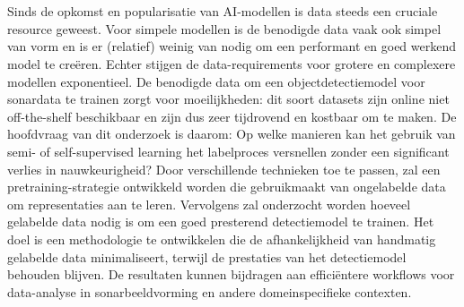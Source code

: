 
%
%
%
%
%


\chapter*{}

Sinds de opkomst en popularisatie van AI-modellen is data steeds een cruciale resource geweest. Voor simpele modellen is de benodigde data vaak ook simpel van vorm en is er (relatief) weinig van nodig om een performant en goed werkend model te creëren. Echter stijgen de data-requirements voor grotere en complexere modellen exponentieel. De benodigde data om een objectdetectiemodel voor sonardata te trainen zorgt voor moeilijkheden: dit soort datasets zijn online niet off-the-shelf beschikbaar en zijn dus zeer tijdrovend en kostbaar om te maken. De hoofdvraag van dit onderzoek is daarom: Op welke manieren kan het gebruik van semi- of self-supervised learning het labelproces versnellen zonder een significant verlies in nauwkeurigheid? Door verschillende technieken toe te passen, zal een pretraining-strategie ontwikkeld worden die gebruikmaakt van ongelabelde data om representaties aan te leren. Vervolgens zal onderzocht worden hoeveel gelabelde data nodig is om een goed presterend detectiemodel te trainen. Het doel is een methodologie te ontwikkelen die de afhankelijkheid van handmatig gelabelde data minimaliseert, terwijl de prestaties van het detectiemodel behouden blijven. De resultaten kunnen bijdragen aan efficiëntere workflows voor data-analyse in sonarbeeldvorming en andere domeinspecifieke contexten.

